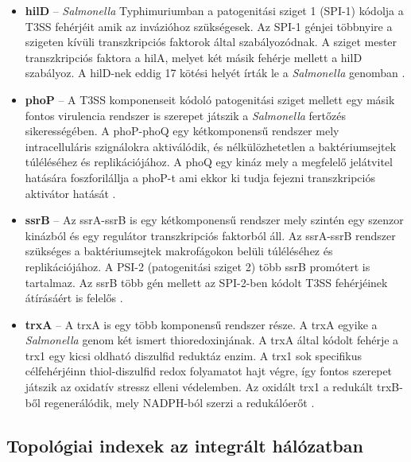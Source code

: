 \documentclass[a4paper,12pt]{article}
\begin{document}
			\begin{itemize}
				\item \textbf{hilD} -- \textit{Salmonella} Typhimuriumban a patogenitási sziget 1 (SPI-1) kódolja a T3SS fehérjéit amik az invázióhoz szükségesek. Az SPI-1 génjei többnyire a szigeten kívüli transzkripciós faktorok által szabályozódnak. A sziget mester transzkripciós faktora a hilA, melyet két másik fehérje mellett a hilD szabályoz. A hilD-nek eddig 17 kötési helyét írták le a \textit{Salmonella} genomban \cite{hilD}.

				\item \textbf{phoP} -- A T3SS komponenseit kódoló patogenitási sziget mellett egy másik fontos virulencia rendszer is szerepet játszik a \textit{Salmonella} fertőzés sikerességében.
				A phoP-phoQ egy kétkomponensű rendszer mely intracelluláris szignálokra aktiválódik, és nélkülözhetetlen a baktériumsejtek túléléséhez és replikációjához. A phoQ egy kináz mely a megfelelő jelátvitel hatására foszforilállja a phoP-t ami ekkor ki tudja fejezni transzkripciós aktivátor hatását \cite{phoP}.

				\item \textbf{ssrB} -- Az ssrA-ssrB is egy kétkomponensű rendszer mely szintén egy szenzor kinázból és egy regulátor transzkripciós faktorból áll. Az ssrA-ssrB rendszer szükséges a baktériumsejtek makrofágokon belüli túléléséhez és replikációjához. A PSI-2 (patogenitási sziget 2) több ssrB promótert is tartalmaz. Az ssrB több gén mellett az SPI-2-ben kódolt T3SS fehérjéinek átírásáért is felelős \cite{ssrB}.

				\item \textbf{trxA} -- A trxA is egy több komponensű rendszer része. A trxA egyike a \textit{Salmonella} genom két ismert thioredoxinjának. A trxA által kódolt fehérje a trx1 egy kicsi oldható diszulfid reduktáz enzim.  A trx1 sok specifikus célfehérjéinn thiol-diszulfid redox folyamatot hajt végre, így fontos szerepet játszik az oxidatív stressz elleni védelemben. Az oxidált trx1 a redukált trxB-ből regenerálódik, mely NADPH-ból szerzi a redukálóerőt \cite{trxA}.
			\end{itemize}

	\subsection{Topológiai indexek az integrált hálózatban}
\end{document}
